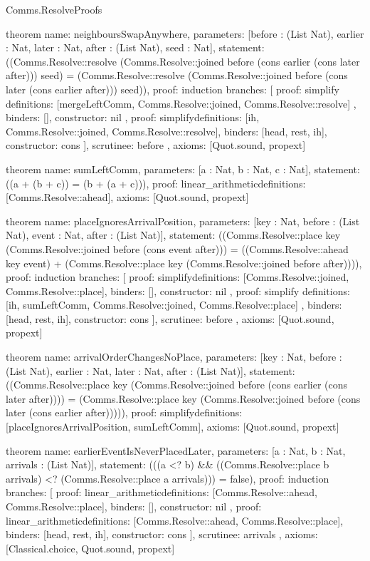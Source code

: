 \begin{lexlean}{Comms.ResolveProofs}
\begin{semanticmodule}
theorem{
  name: neighboursSwapAnywhere,
  parameters: [before : (List Nat), earlier : Nat, later : Nat, after : (List Nat), seed : Nat],
  statement: ((Comms.Resolve::resolve (Comms.Resolve::joined before (cons earlier (cons later after))) seed) = (Comms.Resolve::resolve (Comms.Resolve::joined before (cons later (cons earlier after))) seed)),
  proof: induction{
    branches: [
      {
        proof: simplify{
          definitions: [mergeLeftComm, Comms.Resolve::joined, Comms.Resolve::resolve]
        },
        binders: [],
        constructor: nil
      },
      {
        proof: simplify{definitions: [ih, Comms.Resolve::joined, Comms.Resolve::resolve]},
        binders: [head, rest, ih],
        constructor: cons
      }
    ],
    scrutinee: before
  },
  axioms: [Quot.sound, propext]
}

theorem{
  name: sumLeftComm,
  parameters: [a : Nat, b : Nat, c : Nat],
  statement: ((a + (b + c)) = (b + (a + c))),
  proof: linear_arithmetic{definitions: [Comms.Resolve::ahead]},
  axioms: [Quot.sound, propext]
}

theorem{
  name: placeIgnoresArrivalPosition,
  parameters: [key : Nat, before : (List Nat), event : Nat, after : (List Nat)],
  statement: ((Comms.Resolve::place key (Comms.Resolve::joined before (cons event after))) = ((Comms.Resolve::ahead key event) + (Comms.Resolve::place key (Comms.Resolve::joined before after)))),
  proof: induction{
    branches: [
      {
        proof: simplify{definitions: [Comms.Resolve::joined, Comms.Resolve::place]},
        binders: [],
        constructor: nil
      },
      {
        proof: simplify{
          definitions: [ih, sumLeftComm, Comms.Resolve::joined, Comms.Resolve::place]
        },
        binders: [head, rest, ih],
        constructor: cons
      }
    ],
    scrutinee: before
  },
  axioms: [Quot.sound, propext]
}

theorem{
  name: arrivalOrderChangesNoPlace,
  parameters: [key : Nat, before : (List Nat), earlier : Nat, later : Nat, after : (List Nat)],
  statement: ((Comms.Resolve::place key (Comms.Resolve::joined before (cons earlier (cons later after)))) = (Comms.Resolve::place key (Comms.Resolve::joined before (cons later (cons earlier after))))),
  proof: simplify{definitions: [placeIgnoresArrivalPosition, sumLeftComm]},
  axioms: [Quot.sound, propext]
}

theorem{
  name: earlierEventIsNeverPlacedLater,
  parameters: [a : Nat, b : Nat, arrivals : (List Nat)],
  statement: (((a <? b) && ((Comms.Resolve::place b arrivals) <? (Comms.Resolve::place a arrivals))) = false),
  proof: induction{
    branches: [
      {
        proof: linear_arithmetic{definitions: [Comms.Resolve::ahead, Comms.Resolve::place]},
        binders: [],
        constructor: nil
      },
      {
        proof: linear_arithmetic{definitions: [Comms.Resolve::ahead, Comms.Resolve::place]},
        binders: [head, rest, ih],
        constructor: cons
      }
    ],
    scrutinee: arrivals
  },
  axioms: [Classical.choice, Quot.sound, propext]
}


\end{semanticmodule}
\end{lexlean}
